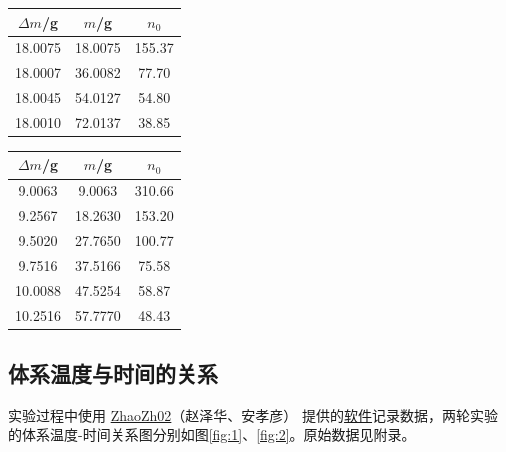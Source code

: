 \documentclass[cn,hazy,pku,12pt,normal,math=newtx,cite=super]{elegantnote}
\begin{document}
\noindent
\begin{minipage}{0.499\textwidth}
  \centering
  \label{tab:1}
  \begin{tabular}{ccc}
    \toprule
    $\Delta m$/g & $m$/g & $n_0$\\
    \midrule
    18.0075 & 18.0075 & 155.37\\
    18.0007 & 36.0082 & 77.70\\
    18.0045 & 54.0127 & 54.80\\
    18.0010 & 72.0137 & 38.85\\
    \bottomrule
  \end{tabular}
\end{minipage}%
\begin{minipage}{0.499\textwidth}
  \centering
  \label{tab:2}
  \begin{tabular}{ccc}
    \toprule
    $\Delta m$/g & $m$/g & $n_0$\\
    \midrule
    9.0063 & 9.0063 & 310.66\\
    9.2567 & 18.2630 & 153.20\\
    9.5020 & 27.7650 & 100.77\\
    9.7516 & 37.5166 & 75.58\\
    10.0088 & 47.5254 & 58.87\\
    10.2516 & 57.7770 & 48.43\\
    \bottomrule
  \end{tabular}
\end{minipage}

\subsection{体系温度与时间的关系}

实验过程中使用 \href{https://github.com/ZhaoZh02}{ZhaoZh02}（赵泽华、安孝彦） 提供的\href{https://github.com/ZhaoZh02/Dissolution-Combustion}{软件}记录数据，两轮实验的体系温度-时间关系图分别如图\ref{fig:1}、\ref{fig:2}。原始数据见附录。
\end{document}
